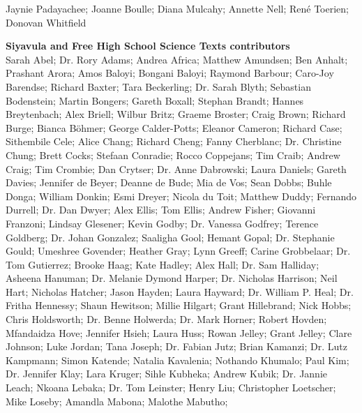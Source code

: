 Jaynie Padayachee; Joanne Boulle; Diana Mulcahy; Annette Nell; René Toerien; Donovan Whitfield \par

\textbf{\LARGE Siyavula and Free High School Science Texts contributors}\\

    Sarah Abel;
Dr. Rory Adams;
    Andrea Africa;
    Matthew Amundsen;
    Ben Anhalt;
    Prashant Arora;
    Amos Baloyi;
    Bongani Baloyi;
    Raymond Barbour;
    Caro-Joy Barendse;
    Richard Baxter;
    Tara Beckerling;
Dr. Sarah Blyth;
    Sebastian Bodenstein;
    Martin Bongers;
    Gareth Boxall;
    Stephan Brandt;
    Hannes Breytenbach;
    Alex Briell;
    Wilbur Britz;
    Graeme Broster;
    Craig Brown;
    Richard Burge;
    Bianca Böhmer;
    George Calder-Potts;
    Eleanor Cameron;
    Richard Case;
    Sithembile Cele;
    Alice Chang;
    Richard Cheng;
    Fanny Cherblanc;
Dr. Christine Chung;
    Brett Cocks;
    Stefaan Conradie;
    Rocco Coppejans;
    Tim Craib;
    Andrew Craig;
    Tim Crombie;
    Dan Crytser;
Dr. Anne Dabrowski;
    Laura Daniels;
    Gareth Davies;
    Jennifer de Beyer;
    Deanne de Bude;
    Mia de Vos;
    Sean Dobbs;
    Buhle Donga;
    William Donkin;
    Esmi Dreyer;
    Nicola du Toit;
    Matthew Duddy;
    Fernando Durrell;
Dr. Dan Dwyer;
    Alex Ellis;
    Tom Ellis;
    Andrew Fisher;
    Giovanni Franzoni;
    Lindsay Glesener;
    Kevin Godby;
Dr. Vanessa Godfrey;
    Terence Goldberg;
Dr. Johan Gonzalez;
    Saaligha Gool;
    Hemant Gopal;
Dr. Stephanie Gould;
    Umeshree Govender;
    Heather Gray;
    Lynn Greeff;
    Carine Grobbelaar;
Dr. Tom Gutierrez;
    Brooke Haag;
    Kate Hadley;
    Alex Hall;
Dr. Sam Halliday;
    Asheena Hanuman;
Dr. Melanie Dymond Harper;
Dr. Nicholas Harrison;
    Neil Hart;
    Nicholas Hatcher;
    Jason Hayden;
    Laura Hayward;
Dr. William P. Heal;
Dr. Fritha Hennessy;
    Shaun Hewitson;
    Millie Hilgart;
    Grant Hillebrand;
    Nick Hobbs;
    Chris Holdsworth;
Dr. Benne Holwerda;
Dr. Mark Horner;
    Robert Hovden;
    Mfandaidza Hove;
    Jennifer Hsieh;
    Laura Huss;
    Rowan Jelley;
    Grant Jelley;
    Clare Johnson;
    Luke Jordan;
    Tana Joseph;
Dr. Fabian Jutz;
    Brian Kamanzi;
Dr. Lutz Kampmann;
    Simon Katende;
    Natalia Kavalenia;
    Nothando Khumalo;
    Paul Kim;
Dr. Jennifer Klay;
    Lara Kruger;
    Sihle Kubheka;
    Andrew Kubik;
Dr. Jannie Leach;
    Nkoana Lebaka;
Dr. Tom Leinster;
    Henry Liu;
    Christopher Loetscher;
    Mike Loseby;
    Amandla Mabona;
    Malothe Mabutho;
